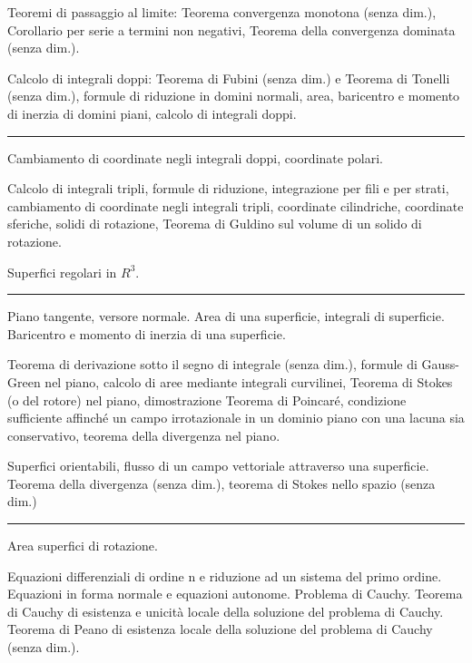 \documentclass[a4paper,10pt]{article} %
\begin{document}
\begin{multicols}{2}
Teoremi di passaggio al limite: Teorema convergenza monotona (senza dim.), Corollario per serie a termini non negativi, Teorema della convergenza dominata (senza dim.).

Calcolo di integrali doppi: Teorema di Fubini (senza dim.) e Teorema di Tonelli (senza dim.), formule di riduzione in domini normali, area, baricentro e momento di inerzia di domini piani, calcolo di integrali doppi.





\bigbreak
\hrule
\bigbreak



Cambiamento di coordinate negli integrali doppi, coordinate polari.

Calcolo di integrali tripli, formule di riduzione, integrazione per fili e per strati, cambiamento di coordinate negli integrali tripli, coordinate cilindriche, coordinate sferiche, solidi di rotazione, Teorema di Guldino sul volume di un solido di rotazione.

Superfici regolari in $R^3$.





\bigbreak
\hrule
\bigbreak








Piano tangente, versore normale. Area di una superficie, integrali di superficie. Baricentro e momento di inerzia di una superficie.

Teorema di derivazione sotto il segno di integrale (senza dim.), formule di Gauss-Green nel piano, calcolo di aree mediante integrali curvilinei, Teorema di Stokes (o del rotore) nel piano, dimostrazione Teorema di Poincaré, condizione sufficiente affinché un campo irrotazionale in un dominio piano con una lacuna sia conservativo, teorema della divergenza nel piano.

Superfici orientabili, flusso di un campo vettoriale attraverso una superficie. Teorema della divergenza (senza dim.), teorema di Stokes nello spazio (senza dim.)







\bigbreak
\hrule
\bigbreak


Area superfici di rotazione.

Equazioni differenziali di ordine n e riduzione ad un sistema del primo ordine. Equazioni in forma normale e equazioni autonome. Problema di Cauchy. Teorema di Cauchy di esistenza e unicità locale della soluzione del problema di Cauchy. Teorema di Peano di esistenza locale della soluzione del  problema di Cauchy (senza dim.). 


\end{multicols}
\end{document}
